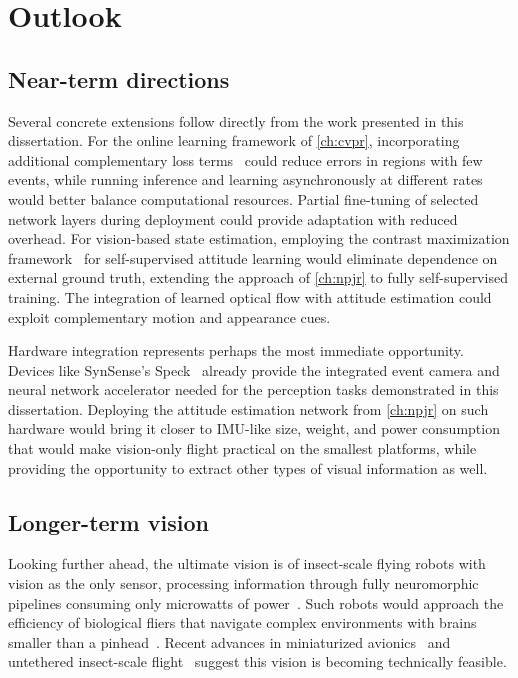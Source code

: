 \section{Outlook}

\subsection*{Near-term directions}

Several concrete extensions follow directly from the work presented in this dissertation. For the online learning framework of \cref{ch:cvpr}, incorporating additional complementary loss terms~\cite{paredes-valles2021back} could reduce errors in regions with few events, while running inference and learning asynchronously at different rates would better balance computational resources. Partial fine-tuning of selected network layers during deployment could provide adaptation with reduced overhead. For vision-based state estimation, employing the contrast maximization framework~\cite{gallego2018unifying} for self-supervised attitude learning would eliminate dependence on external ground truth, extending the approach of \cref{ch:npjr} to fully self-supervised training. The integration of learned optical flow with attitude estimation could exploit complementary motion and appearance cues.

Hardware integration represents perhaps the most immediate opportunity. Devices like SynSense's Speck~\cite{richter2024speck} already provide the integrated event camera and neural network accelerator needed for the perception tasks demonstrated in this dissertation. Deploying the attitude estimation network from \cref{ch:npjr} on such hardware would bring it closer to IMU-like size, weight, and power consumption that would make vision-only flight practical on the smallest platforms, while providing the opportunity to extract other types of visual information as well.

\subsection*{Longer-term vision}

Looking further ahead, the ultimate vision is of insect-scale flying robots with vision as the only sensor, processing information through fully neuromorphic pipelines consuming only microwatts of power~\cite{decroon2022insectinspired}. Such robots would approach the efficiency of biological fliers that navigate complex environments with brains smaller than a pinhead~\cite{srinivasan2012biology}. Recent advances in miniaturized avionics~\cite{yu2025tinysense} and untethered insect-scale flight~\cite{jafferis2019untethered} suggest this vision is becoming technically feasible.

